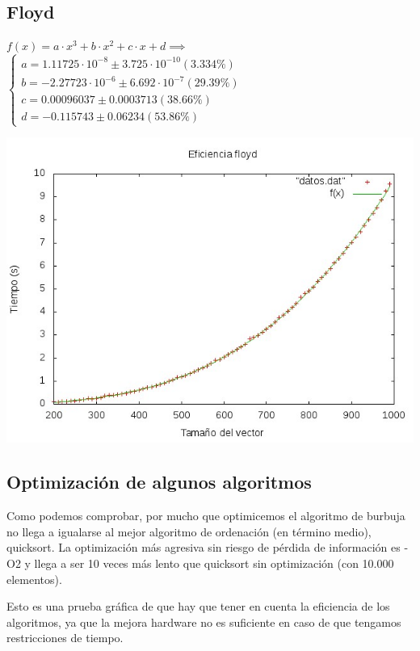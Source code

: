 \documentclass[11pt,spanish]{article} %
\begin{document}
\subsection{Floyd}
$f(x) = a\cdot x^3 + b\cdot x^2 + c\cdot x + d \implies$
$\left\{ \begin{array}{c}
a               = 1.11725\cdot 10^{-8}      \pm 3.725\cdot 10^{-10}    (3.334\%) \\
b               = -2.27723\cdot 10^{-6}     \pm 6.692\cdot 10^{-7}    (29.39\%) \\
c               = 0.00096037       \pm 0.0003713    (38.66\%) \\
d               = -0.115743        \pm 0.06234      (53.86\%)
\end{array}\right.$

\begin{center}
\includegraphics[scale=0.55]{../Graficas/Floyd/floydO0_ruben.jpeg}
\end{center}
\newpage

\subsection{Optimizaci\'on de algunos algoritmos}
Como podemos comprobar, por mucho que optimicemos el algoritmo de burbuja no llega a igualarse al mejor algoritmo de ordenación (en término medio), quicksort. La optimización más agresiva sin riesgo de pérdida de información es -O2 y llega a ser 10 veces más lento que quicksort sin optimización (con 10.000 elementos).

Esto es una prueba gráfica de que hay que tener en cuenta la eficiencia de los algoritmos, ya que la mejora hardware no es suficiente en caso de que tengamos restricciones de tiempo.
\end{document}
